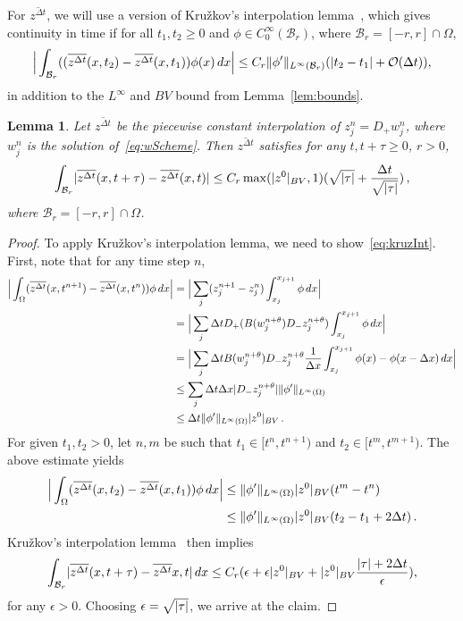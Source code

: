 \documentclass[11pt,leqno]{amsart}
\newtheorem{lemma}{Lemma}[section]
\newcommand{\Dp}{D_+}
\newcommand{\Dm}{D_-}
\newcommand{\normLinf}[1]{\norm{#1}_{L^\infty(\Omega)}}
\newcommand{\normBV}[1]{\abs{#1}_{BV}}
\newcommand{\zcon}{\overline{z^{\Delta t}}}
\newcommand{\Br}{{\mathcal{B}_r}}
\DeclarePairedDelimiter\abs{\lvert}{\rvert}
\DeclarePairedDelimiter\norm{\lVert}{\rVert}
\begin{document}
For $\zcon$, we will use a version of Kru\v{z}kov's interpolation lemma~\cite[p.~208, Lemma~4.11]{HoldenRisebro-book}, which gives continuity in time if for all $t_1,t_2\ge 0$ and $\phi\in C^\infty_0(\Br)$, where $\Br=[-r,r]\cap \Omega$, 
\begin{equation}\label{eq:kruzInt}
  \Big\lvert \int_\Br ((\zcon(x,t_2)-\zcon(x,t_1))\phi(x)\,dx \Big\rvert \le C_r  \norm{\phi'}_{L^\infty(\Br)}(\abs{t_2-t_1}+ \mathcal{O}(\Delta t)),
\end{equation}  
in addition to the $L^\infty$ and $BV$ bound from Lemma~\ref{lem:bounds}.
\begin{lemma}\label{lem:ztime}
Let $\zcon$ be the piecewise constant interpolation of $z^n_j=\Dp w^n_j$, where $w^n_j$ is the solution of~\eqref{eq:wScheme}. Then $\zcon$ satisfies for any $t,t+\tau\ge 0$, $r>0$, 
\begin{equation*}
  \int_\Br \abs{\zcon(x,t+\tau)-\zcon(x,t)}\le C_r \max(\normBV{z^0},1)(\sqrt{\abs{\tau}}+\frac{\Delta t}{\sqrt{\abs{\tau}}})\,,
\end{equation*}  
where $\Br=[-r,r]\cap \Omega$.
\end{lemma}
\begin{proof}
  To apply Kru\v{z}kov's interpolation lemma, we need to show~\eqref{eq:kruzInt}. First, note that for any time step $n$,
\begin{align*}
  \Big\lvert \int_\Omega (\zcon(x,t^{n+1})-\zcon(x,t^n))\phi\,dx\Big\rvert&=\Big\lvert \sum_j (z^{n+1}_j-z^n_j)\int_{x_j}^{x_{j+1}}\phi\,dx\Big\rvert\\
&= \Big\lvert \sum_j \Delta t \Dp(B(w^{n+\theta}_j) \Dm z^{n+\theta}_j)\int_{x_j}^{x_{j+1}}\phi\,dx\Big\rvert\\
&= \Big\lvert \sum_j \Delta t B(w^{n+\theta}_j) \Dm z^{n+\theta}_j \frac{1}{\Delta x} \int_{x_j}^{x_{j+1}}\phi(x)-\phi(x-\Delta x)\,dx\Big\rvert\\
&\le \sum_j \Delta t \Delta x \abs{\Dm z^{n+\theta}_j} \normLinf{\phi'}\\
&\le \Delta t \normLinf{\phi'} \normBV{z^0}\,.
\end{align*}
For given $t_1,t_2>0$, let $n,m$ be such that $t_1\in [t^n,t^{n+1})$ and $t_2\in [t^m,t^{m+1})$. The above estimate yields
\begin{align*}
  \Big\lvert \int_\Omega (\zcon(x,t_2)- \zcon(x,t_1)) \phi \,dx\Big\rvert &\le   \normLinf{\phi'}\normBV{z^0}(t^m-t^n)\\
&\le  \normLinf{\phi'}\normBV{z^0}(t_2-t_1 + 2\Delta t)\,.
\end{align*}
Kru\v{z}kov's interpolation lemma~\cite[p.~208, Lemma~4.11]{HoldenRisebro-book} then implies
\begin{equation*}
  \int_\Br \abs{\zcon(x,t+\tau)-\zcon{x,t}}\,dx \le C_r (\epsilon + \epsilon \normBV{z^0} + \normBV{z^0} \frac{\abs{\tau}+2\Delta t}{\epsilon} ),
\end{equation*}
for any $\epsilon>0$. Choosing $\epsilon=\sqrt{\abs{\tau}}$, we arrive at the claim.
\end{proof}
\end{document}
